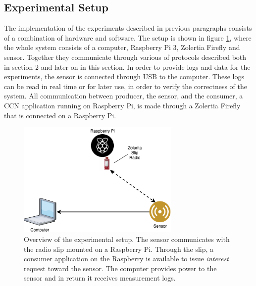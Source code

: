 \subsection{Experimental Setup}
The implementation of the experiments described in previous paragraphs consists of a combination of hardware and software. The setup is shown in figure \ref{fig:experiment_setup}, where the whole system consists of a computer, Raspberry Pi 3, Zolertia Firefly and sensor. Together they communicate through various of protocols described both in section 2 and later on in this section. 
In order to provide logs and data for the experiments, the sensor is connected through USB to the computer. These logs can be read in real time or for later use, in order to verify the correctness of the system. All communication between producer, the sensor, and the consumer, a CCN application running on Raspberry Pi, is made through a Zolertia Firefly that is connected on a Raspberry Pi.

\begin{figure}\centering
	\includegraphics[width=0.7\textwidth]{figures/experiment_setup.png}
	\caption{Overview of the experimental setup. The sensor communicates with the radio slip mounted on a Raspberry Pi. Through the slip, a consumer application on the Raspberry is available to issue \textit{interest} request toward the sensor. The computer provides power to the sensor and in return it receives measurement logs.}
	\label{fig:experiment_setup}
\end{figure}






